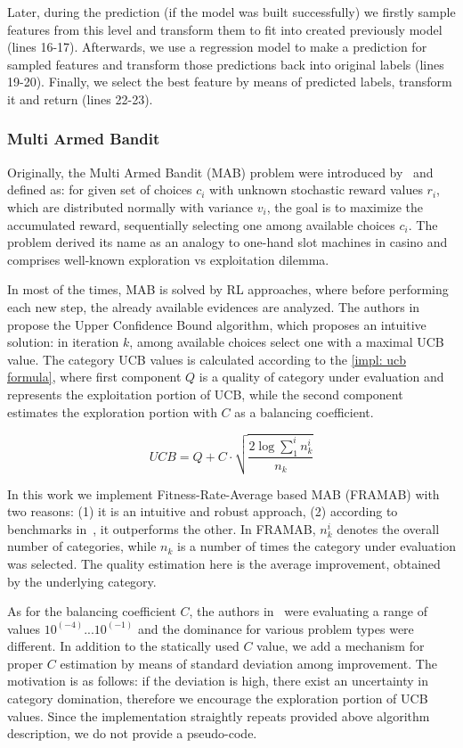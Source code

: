 Later, during the prediction (if the model was built successfully) we firstly sample features from this level and transform them to fit into created previously model (lines 16-17). Afterwards, we use a regression model to make a prediction for sampled features and transform those predictions back into original labels (lines 19-20). Finally, we select the best feature by means of predicted labels, transform it and return (lines 22-23).

\subsubsection{Multi Armed Bandit}
Originally, the Multi Armed Bandit (MAB) problem were introduced by~\cite{robbins1952some} and defined as: for given set of choices $c_i$ with unknown stochastic reward values $r_i$, which are distributed normally with variance $v_i$, the goal is to maximize the accumulated reward, sequentially selecting one among available choices $c_i$. The problem derived its name as an analogy to one-hand slot machines in casino and comprises well-known exploration vs exploitation dilemma.

In most of the times, MAB is solved by RL approaches, where before performing each new step, the already available evidences are analyzed. The authors in~\cite{auer2002finite} propose the Upper Confidence Bound algorithm, which proposes an intuitive solution: in iteration $k$, among available choices select one with a maximal UCB value. The category UCB values is calculated according to the \cref{impl: ucb formula}, where first component $Q$ is a quality of category under evaluation and represents the exploitation portion of UCB, while the second component estimates the exploration portion with $C$ as a balancing coefficient. 

\begin{equation}
UCB = Q + C \cdot \sqrt{\frac{2 \log \sum_{1}^{i} n_k^i}{n_k}}
\label{impl: ucb formula}
\end{equation}

In this work we implement Fitness-Rate-Average based MAB (FRAMAB) with two reasons: (1) it is an intuitive and robust approach, (2) according to benchmarks in~\cite{ferreira2017multi}, it outperforms the other. In FRAMAB, $n_k^i$ denotes the overall number of categories, while $n_k$ is a number of times the category under evaluation was selected. The quality estimation here is the average improvement, obtained by the underlying category.

As for the balancing coefficient $C$, the authors in~\cite{ferreira2017multi} were evaluating a range of values $10^(-4)...10^(-1)$ and the dominance for various problem types were different. In addition to the statically used $C$ value, we add a mechanism for proper $C$ estimation by means of standard deviation among improvement. The motivation is as follows: if the deviation is high, there exist an uncertainty in category domination, therefore we encourage the exploration portion of UCB values. Since the implementation straightly repeats provided above algorithm description, we do not provide a pseudo-code.


